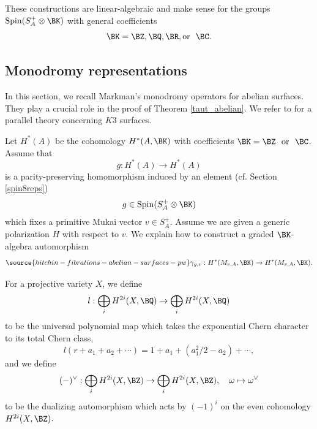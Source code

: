 These constructions are linear-algebraic and make sense for the groups $\mathrm{Spin}(S_A^+\otimes \BK)$ with general coefficients
\[
\BK = \BZ, \BQ, \BR, \mathrm{or}~~ \BC.
\]





\subsection{Monodromy representations}\label{Monodromy}
In this section, we recall Markman's monodromy operators \cite{Markman3} for abelian surfaces. They play a crucial role in the proof of Theorem \ref{taut_abelian}. We refer to \cite{Markman2} for a parallel theory concerning $K3$ surfaces.

Let $H^\ast(A)$ be the cohomology $H^\ast(A, \BK)$ with coefficients $\BK = \BZ~~\mathrm{or}~~ \BC$.  Assume that
\[
g: H^*(A) \to H^*(A)
\]
is a parity-preserving homomorphism induced by an element (cf. Section \ref{spin8reps})
\[
g \in \mathrm{Spin}(S_A^+\otimes \BK)
\]
 which fixes a primitive Mukai vector $v\in S_A^+$.
Assume we are given a generic polarization $H$ with respect to $v$.
We explain how to construct a graded $\BK$-algebra automorphism
\begin{equation*}\label{mono1}
\source{hitchin-fibrations-abelian-surfaces-pw}
\gamma_{g,v}:  H^*(M_{v,A}, \BK) \to H^*(M_{v,A}, \BK).
\end{equation*}



For a projective variety $X$, we define
\[
l: \bigoplus_i H^{2i}(X, \BQ) \rightarrow \bigoplus_i H^{2i}(X, \BQ)
\]
to be the universal polynomial map which takes the exponential Chern character to its total Chern class,
\[
l(r+a_1+a_2 + \cdots) = 1+a_1 + (a_1^2/2-a_2) + \cdots,
\]
and we define
\[
(-)^\vee: \bigoplus_iH^\mathrm{2i}(X, \BZ) \to \bigoplus_i H^{2i}(X, \BZ), \quad \omega \mapsto \omega^\vee
\]
to be the dualizing automorphism which acts by $(-1)^i$  on the even cohomology $H^{2i}(X, \BZ)$.

